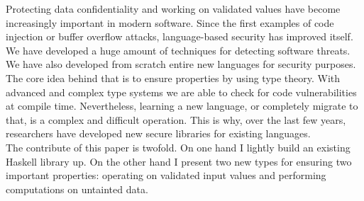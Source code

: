 Protecting data confidentiality and working on validated values have become increasingly important in modern software. Since the first examples of code injection or buffer overflow attacks, language-based security has improved itself. We have developed a huge amount of techniques for detecting software threats. We have also developed from scratch entire new languages for security purposes. \\
The core idea behind that is to ensure properties by using type theory. With advanced and complex type systems we are able to check for code vulnerabilities at compile time. Nevertheless, learning a new language, or completely migrate to that, is a complex and difficult operation. This is why, over the last few years, researchers have developed new secure libraries for existing languages. \\
The contribute of this paper is twofold. On one hand I lightly build an existing Haskell library up. On the other hand I present two new types for ensuring two important properties: operating on validated input values and performing computations on untainted data.